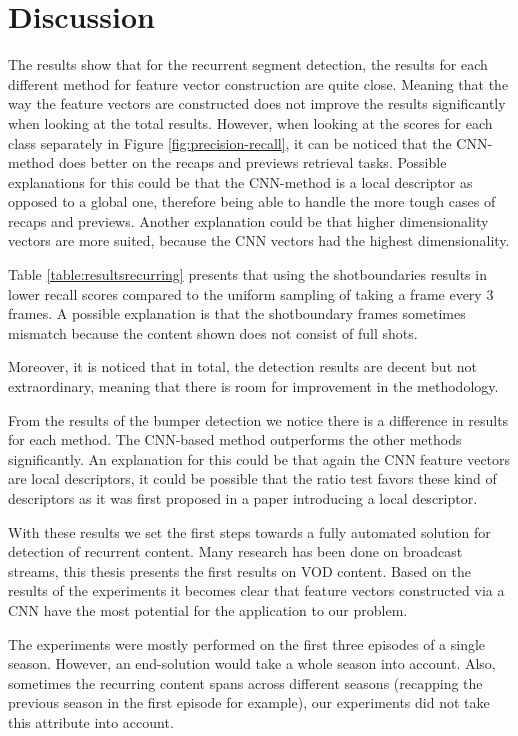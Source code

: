 \documentclass{article}
\begin{document}
\section{Discussion} \label{discussion}
The results show that for the recurrent segment detection, the results for each different method for feature vector construction are quite close. Meaning that the way the feature vectors are constructed does not improve the results significantly when looking at the total results. However, when looking at the scores for each class separately in Figure \ref{fig:precision-recall}, it can be noticed that the CNN-method does better on the recaps and previews retrieval tasks. Possible explanations for this could be that the CNN-method is a local descriptor as opposed to a global one, therefore being able to handle the more tough cases of recaps and previews. Another explanation could be that higher dimensionality vectors are more suited, because the CNN vectors had the highest dimensionality.

Table \ref{table:resultsrecurring} presents that using the shotboundaries results in lower recall scores compared to the uniform sampling of taking a frame every 3 frames. A possible explanation is that the shotboundary frames sometimes mismatch because the content shown does not consist of full shots.


Moreover, it is noticed that in total, the detection results are decent but not extraordinary, meaning that there is room for improvement in the methodology. 

From the results of the bumper detection we notice there is a difference in results for each method. The CNN-based method outperforms the other methods significantly. An explanation for this could be that again the CNN feature vectors are local descriptors, it could be possible that the ratio test favors these kind of descriptors as it was first proposed in a paper introducing a local descriptor.

With these results we set the first steps towards a fully automated solution for detection of recurrent content. Many research has been done on broadcast streams, this thesis presents the first results on VOD content. Based on the results of the experiments it becomes clear that feature vectors constructed via a CNN have the most potential for the application to our problem.

The experiments were mostly performed on the first three episodes of a single season. However, an end-solution would take a whole season into account. Also, sometimes the recurring content spans across different seasons (recapping the previous season in the first episode for example), our experiments did not take this attribute into account.
\end{document}
